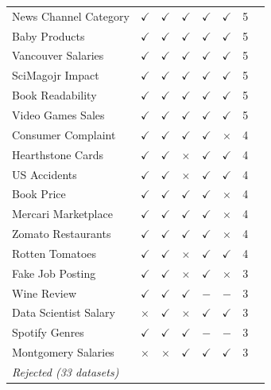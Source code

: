 \begin{longtable}{llcccccr}
News Channel Category    & $\checkmark$ & $\checkmark$ & $\checkmark$ & $\checkmark$ & $\checkmark$ & 5 \\
Baby Products   & $\checkmark$ & $\checkmark$ & $\checkmark$ & $\checkmark$ & $\checkmark$ & 5 \\
Vancouver Salaries   & $\checkmark$ & $\checkmark$ & $\checkmark$ & $\checkmark$ & $\checkmark$ & 5 \\
SciMagojr Impact  & $\checkmark$ & $\checkmark$ & $\checkmark$ & $\checkmark$ & $\checkmark$ & 5 \\
Book Readability  & $\checkmark$ & $\checkmark$ & $\checkmark$ & $\checkmark$ & $\checkmark$ & 5 \\
Video Games Sales   & $\checkmark$ & $\checkmark$ & $\checkmark$ & $\checkmark$ & $\checkmark$ & 5 \\
Consumer Complaint   & $\checkmark$ & $\checkmark$ & $\checkmark$ & $\checkmark$ & $\times$     & 4 \\
Hearthstone Cards  & $\checkmark$ & $\checkmark$ & $\times$     & $\checkmark$ & $\checkmark$ & 4 \\
US Accidents   & $\checkmark$ & $\checkmark$ & $\times$     & $\checkmark$ & $\checkmark$ & 4 \\
Book Price  & $\checkmark$ & $\checkmark$ & $\checkmark$ & $\checkmark$ & $\times$     & 4 \\
Mercari Marketplace  & $\checkmark$ & $\checkmark$ & $\checkmark$ & $\checkmark$ & $\times$     & 4 \\
Zomato Restaurants   & $\checkmark$ & $\checkmark$ & $\checkmark$ & $\checkmark$ & $\times$     & 4 \\
Rotten Tomatoes   & $\checkmark$ & $\checkmark$ & $\times$     & $\checkmark$ & $\checkmark$ & 4 \\
Fake Job Posting   & $\checkmark$ & $\checkmark$ & $\times$     & $\checkmark$ & $\times$     & 3 \\
Wine Review  & $\checkmark$ & $\checkmark$ & $\checkmark$ & $-$          & $-$          & 3 \\
Data Scientist Salary  & $\times$     & $\checkmark$ & $\times$     & $\checkmark$ & $\checkmark$ & 3 \\
Spotify Genres   & $\checkmark$ & $\checkmark$ & $\checkmark$ & $-$          & $-$          & 3 \\
Montgomery Salaries  & $\times$     & $\times$     & $\checkmark$ & $\checkmark$ & $\checkmark$ & 3 \\
\midrule
\multicolumn{8}{l}{\textit{Rejected (33 datasets)}} \\[2pt]

\end{longtable}
